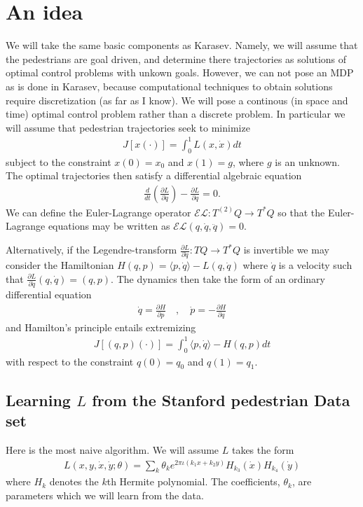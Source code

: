 \documentclass[12pt]{amsart}
\newcommand{\pder}[2]{\ensuremath{\frac{ \partial #1}{\partial #2}}}
\begin{document}
\section{An idea}
We will take the same basic components as Karasev.
Namely, we will assume that the pedestrians are goal driven, and determine there trajectories as solutions of optimal control problems with unkown goals.
However, we can not pose an MDP as is done in Karasev, because computational techniques to obtain solutions require discretization (as far as I know).
We will pose a continous (in space and time) optimal control problem rather than a discrete problem.
In particular we will assume that pedestrian trajectories seek to minimize
\begin{align*}
    J[x(\cdot) ] = \int_0^1 L(x,\dot{x}) dt
\end{align*}
subject to the constraint $x(0) = x_0$ and $x(1) = g$, where $g$ is an unknown.
The optimal trajectories then satisfy a differential algebraic equation
\begin{align*}
    \frac{d}{dt} \left( \pder{L}{\dot{q}} \right) - \pder{L}{q} = 0.
\end{align*}
We can define the Euler-Lagrange operator $\mathcal{EL}: T^{(2)}Q \to T^*Q$ so that the Euler-Lagrange equations may be written as $\mathcal{EL}(q,\dot{q},\ddot{q}) = 0$.

Alternatively, if the Legendre-transform $\pder{L}{\dot{q}} : TQ \to T^*Q$ is invertible we may consider the Hamiltonian $H(q,p) = \langle p , \dot{q} \rangle - L(q,\dot{q})$ where $\dot{q}$ is a velocity such that $\pder{L}{\dot{q}}(q,\dot{q}) = (q,p)$.
The dynamics then take the form of an ordinary differential equation
\begin{align*}
	\dot{q} = \pder{H}{p} \quad,\quad \dot{p} = - \pder{H}{q}
\end{align*}
and Hamilton's principle entails extremizing
\begin{align*}
	J[ (q,p)(\cdot) ] = \int_0^1 \langle p , \dot{q} \rangle - H(q,p) dt
\end{align*}
with respect to the constraint $q(0) = q_0$ and $q(1) = q_1$.


\subsection{Learning $L$ from the Stanford pedestrian Data set}
Here is the most naive algorithm.  We will assume $L$ takes the form
\begin{align*}
	L(x,y,\dot{x},\dot{y} ; \theta) = \sum_k \theta_k e^{2\pi \iota (k_1 x + k_2 y) } H_{k_3}(\dot{x}) H_{k_{4}}(\dot{y})
\end{align*}
where $H_k$ denotes the $k$th Hermite polynomial.
The coefficients, $\theta_k$, are parameters which we will learn from the data.
\end{document}
